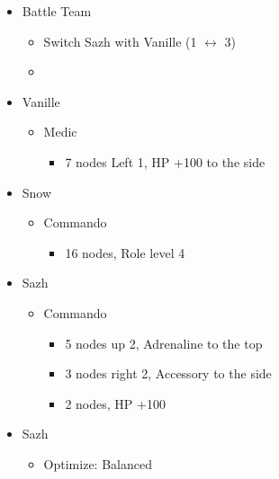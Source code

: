 	\begin{menu}
		\begin{itemize}
			\paradigm
			\begin{itemize}
				\item Battle Team
				      \begin{itemize}
					      \item Switch Sazh with Vanille (1 $\leftrightarrow$ 3)
					      \item {}%
					            {\paradigmline{(\med)}{\com}{(\com)}}%
					            {\paradigmline{(\sab)}{\com}{\com}}%
					            {\paradigmline{\rav}{\sen}{\rav}}%
					            {\paradigmline{(\rav)}{(\rav)}{(\syn)}}%
					            {\paradigmline[5]{\textit{(\sab)}}{\textit{(\rav)}}{\textit{\rav}}}%
					            {\paradigmline{\rav}{\rav}{\rav}}
				      \end{itemize}
			\end{itemize}
			\crystarium
			\begin{itemize}
				\item Vanille
				      \begin{itemize}
					      \item Medic
					            \begin{itemize}
						            \item 7 nodes Left 1, HP +100 to the side
					            \end{itemize}
				      \end{itemize}
				\item Snow
				      \begin{itemize}
					      \item Commando
					            \begin{itemize}
						            \item 16 nodes, Role level 4
					            \end{itemize}
				      \end{itemize}
				\item Sazh
				      \begin{itemize}
					      \item Commando
					            \begin{itemize}
						            \item 5 nodes up 2, Adrenaline to the top
						            \item 3 nodes right 2, Accessory to the side
						            \item 2 nodes, HP +100
					            \end{itemize}
				      \end{itemize}
			\end{itemize}
			\equip
			\begin{itemize}
				\item Sazh
				      \begin{itemize}
					      \item Optimize: Balanced
				      \end{itemize}
			\end{itemize}
		\end{itemize}
	\end{menu}


